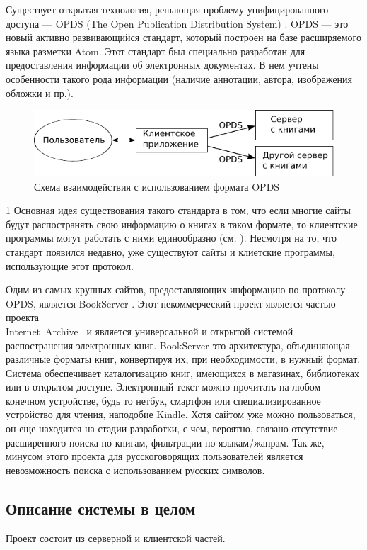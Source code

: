 Существует открытая технология, решающая проблему унифицированного доступа  --- OPDS (The Open Publication Distribution System) \cite{opds}.
OPDS --- это новый активно развивающийся стандарт, который построен на базе расширяемого языка разметки Atom. Этот стандарт был специально разработан для предоставления информации об электронных документах. В нем учтены особенности такого рода информации (наличие аннотации, автора, изображения обложки и пр.).



\begin{figure}
\centering
\includegraphics[width=.7\textwidth]{./head/scheme}
\caption{Схема взаимодействия с использованием формата OPDS}\label{fig:scheme}
\end{figure}1
Основная идея существования такого стандарта в том, что если многие сайты будут распостранять свою информацию о книгах в таком формате, то клиентские программы могут работать с ними единообразно (см. ). Несмотря на то, что стандарт появился недавно, уже существуют сайты и клиетские программы, использующие этот протокол. 


Одим из самых крупных сайтов, предоставляющих информацию по протоколу OPDS, является BookServer \cite{bookserver}.
Этот некоммерческий проект является частью проекта\\ Internet~Archive~\cite{archive} и является универсальной и открытой системой распостранения электронных книг. BookServer это архитектура, объединяющая различные форматы книг, конвертируя их, при необходимости, в нужный формат. Система обеспечивает каталогизацию книг, имеющихся в магазинах, библиотеках или в открытом доступе. Электронный текст можно прочитать на любом конечном устройстве, будь то нетбук, смартфон или специализированное устройство для чтения, наподобие Kindle. Хотя сайтом уже можно пользоваться, он еще находится на стадии разработки, с чем, вероятно, связано отсутствие расширенного поиска по книгам, фильтрации по языкам/жанрам. Так же, минусом этого проекта для русскоговорящих пользователей является невозможность поиска с использованием русских символов.

\subsection{Описание системы в целом}
Проект состоит из серверной и клиентской частей.

